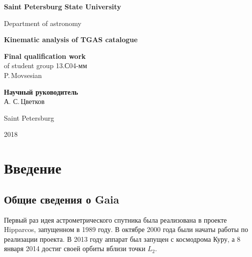 \documentclass[14pt]{article} %
\begin{document}
\begin{titlepage}

\begin{center}
{\small \bf Saint Petersburg State University

Department of astronomy}
\end{center}

\vspace{2cm}
\begin{center}
  \large{\bf Kinematic analysis of TGAS catalogue}
 \end{center}

\vspace{3cm}

\hspace{8cm}\parbox{8cm}{	%

\footnotesize{{\bf Final qualification work}\\
of student group 13.С04-мм\\
P.\,Movsesian}  %

\vspace{1cm}

{\bf Научный руководитель}\\
А. С.\,Цветков \\  %
}


\vfill %

\begin{center}
\small {Saint Petersburg

2018}
\end{center}

\end{titlepage}

\tableofcontents
\newpage

\section{Введение}
\subsection{Общие сведения о Gaia}
Первый раз идея астрометрического спутника была реализована в проекте Hipparcos, запущенном в 1989 году. В октябре 2000 года были начаты работы по реализации проекта. В 2013 году аппарат был запущен с космодрома Куру, а 8 января 2014 достиг своей орбиты вблизи точки $L_2$.
\end{document}
